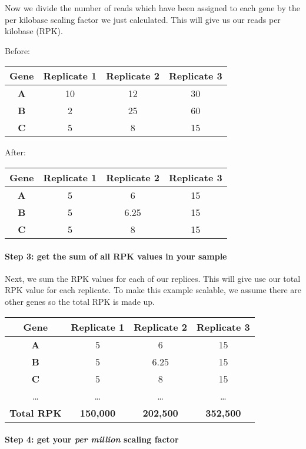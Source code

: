 \documentclass[11pt]{article}
\begin{document}
Now we divide the number of reads which have been assigned to each gene
by the per kilobase scaling factor we just calculated. This will give us
our reads per kilobase (RPK).

Before:

\begin{longtable}[]{@{}cccc@{}}
\hline
Gene & Replicate 1 & Replicate 2 & Replicate 3\tabularnewline
\hline
\endhead
\textbf{A} & 10 & 12 & 30\tabularnewline
\textbf{B} & 2 & 25 & 60\tabularnewline
\textbf{C} & 5 & 8 & 15\tabularnewline
\hline
\end{longtable}

After:

\begin{longtable}[]{@{}cccc@{}}
\hline
Gene & Replicate 1 & Replicate 2 & Replicate 3\tabularnewline
\hline
\endhead
\textbf{A} & 5 & 6 & 15\tabularnewline
\textbf{B} & 5 & 6.25 & 15\tabularnewline
\textbf{C} & 5 & 8 & 15\tabularnewline
\hline
\end{longtable}

\newpage

\hypertarget{step-3-get-the-sum-of-all-rpk-values-in-your-sample}{%
\paragraph{Step 3: get the sum of all RPK values in your
sample}\label{step-3-get-the-sum-of-all-rpk-values-in-your-sample}}

Next, we sum the RPK values for each of our replices. This will give use
our total RPK value for each replicate. To make this example scalable,
we assume there are other genes so the total RPK is made up.

\begin{longtable}[]{@{}cccc@{}}
\hline
Gene & Replicate 1 & Replicate 2 & Replicate 3\tabularnewline
\hline
\endhead
\textbf{A} & 5 & 6 & 15\tabularnewline
\textbf{B} & 5 & 6.25 & 15\tabularnewline
\textbf{C} & 5 & 8 & 15\tabularnewline
\ldots{} & \ldots{} & \ldots{} & \ldots{}\tabularnewline
\textbf{Total RPK} & \textbf{150,000} & \textbf{202,500} &
\textbf{352,500}\tabularnewline
\hline
\end{longtable}

\hypertarget{step-4-get-your-per-million-scaling-factor}{%
\paragraph{\texorpdfstring{Step 4: get your \textit{per million} scaling
factor}{Step 4: get your per million scaling factor}}\label{step-4-get-your-per-million-scaling-factor}}
\end{document}
